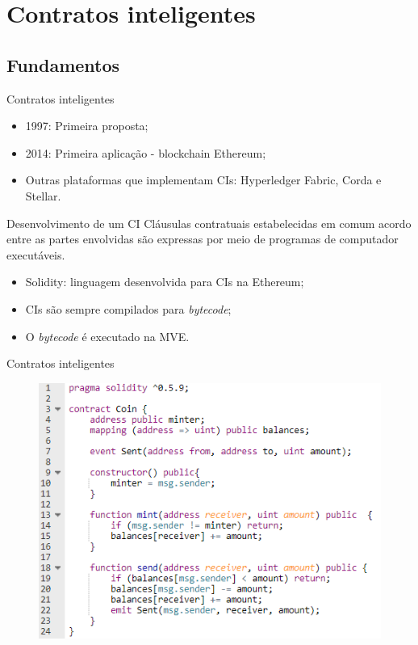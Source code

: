 \section{Contratos inteligentes}
\subsection{Fundamentos}

\begin{frame}{Contratos inteligentes}
    \begin{itemize}
        \item 1997: Primeira proposta;
        \item 2014: Primeira aplicação - blockchain Ethereum;
        \item Outras plataformas que implementam CIs: Hyperledger Fabric, Corda e Stellar.
    \end{itemize}
    \begin{block}{Desenvolvimento de um CI}
    Cláusulas contratuais estabelecidas em comum acordo entre as partes envolvidas são expressas por meio de programas de computador executáveis.
    \end{block}
    \begin{itemize}
        \item Solidity: linguagem desenvolvida para CIs na Ethereum;
        \item CIs são sempre compilados para \textit{bytecode};
        \item O \textit{bytecode} é executado na MVE.
    \end{itemize}
\end{frame}

\begin{frame}{Contratos inteligentes}
    \begin{figure}[!htb]
     \centering
     \includegraphics[scale=0.6]{figuras/contratos-inteligentes/exemplo_codigo_solidity.png}
    \end{figure}
\end{frame}

